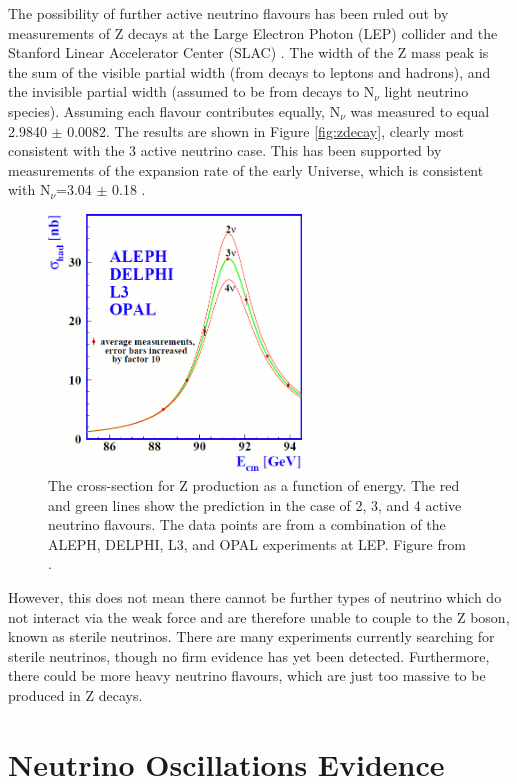 The possibility of further active neutrino flavours has been ruled out by measurements of Z decays at the Large Electron Photon (LEP) collider and the Stanford Linear Accelerator Center (SLAC) \cite{lepslac}. The width of the Z mass peak is the sum of the visible partial width (from decays to leptons and hadrons), and the invisible partial width (assumed to be from decays to N$_{\nu}$ light neutrino species). Assuming each flavour contributes equally, N$_{\nu}$ was measured to equal 2.9840 $\pm$ 0.0082. The results are shown in Figure \ref{fig:zdecay}, clearly most consistent with the 3 active neutrino case. This has been supported by measurements of the expansion rate of the early Universe, which is consistent with N$_{\nu}$=3.04 $\pm$ 0.18 \cite{universalN}.

\begin{figure}
\centering
\includegraphics*[width=0.6\textwidth,clip]{figs/zdecay}
\caption{The cross-section for Z production as a function of energy. The red and green lines show the prediction in the case of 2, 3, and 4 active neutrino flavours. The data points are from a combination of the ALEPH, DELPHI, L3, and OPAL experiments at LEP. Figure from \cite{aleph}.} \label{zdecay}
\end{figure}


However, this does not mean there cannot be further types of neutrino which do not interact via the weak force and are therefore unable to couple to the Z boson, known as sterile neutrinos. There are many experiments currently searching for sterile neutrinos, though no firm evidence has yet been detected. Furthermore, there could be more heavy neutrino flavours, which are just too massive to be produced in Z decays.

\section{Neutrino Oscillations Evidence}\label{sec:neutrinooscillationevidence}

